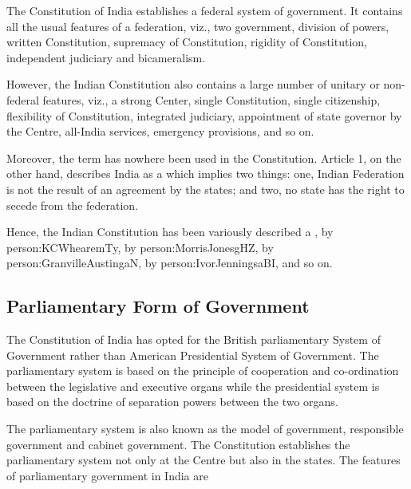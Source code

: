 The Constitution of India establishes a federal system of government. It contains all the usual features of a federation, viz., two government, division of powers, written Constitution, supremacy of Constitution, rigidity of Constitution, independent judiciary and bicameralism.

However, the Indian Constitution also contains a large number of unitary or non-federal features, viz., a strong Center, single Constitution, single citizenship, flexibility of Constitution, integrated judiciary, appointment of state governor by the Centre, all-India services, emergency provisions, and so on.

Moreover, the term  has nowhere been used in the Constitution. Article 1, on the other hand, describes India as a  which implies two things: one, Indian Federation is not the result of an agreement by the states; and two, no state has the right to secede from the federation.

Hence, the Indian Constitution has been variously described a ,  by \gls{person:KCWhearemTy},  by \gls{person:MorrisJonesgHZ},  by \gls{person:GranvilleAustingaN},  by \gls{person:IvorJenningsaBI}, and so on.

\subsection{Parliamentary Form of Government}

The Constitution of India has opted for the British parliamentary System of Government rather than American Presidential System of Government. The parliamentary system is based on the principle of cooperation and co-ordination between the legislative and executive organs while the presidential system is based on the doctrine of separation powers between the two organs.

The parliamentary system is also known as the  model of government, responsible government and cabinet government. The Constitution establishes the parliamentary system not only at the Centre but also in the states. The features of parliamentary government in India are

